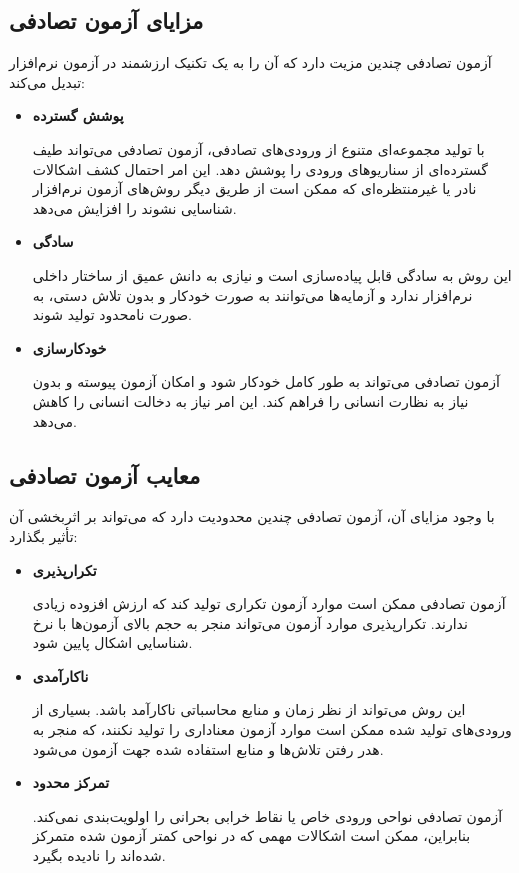 \subsection{مزایای آزمون تصادفی}
آزمون تصادفی چندین مزیت دارد که آن را به یک تکنیک ارزشمند در آزمون نرم‌افزار تبدیل می‌کند:
\begin{itemize}
	\item \textbf{پوشش گسترده}
	
	با تولید مجموعه‌ای متنوع از ورودی‌های تصادفی، آزمون تصادفی می‌تواند طیف گسترده‌ای از سناریوهای ورودی را پوشش دهد. این امر احتمال کشف اشکالات نادر یا غیرمنتظره‌ای که ممکن است از طریق دیگر روش‌های آزمون نرم‌افزار شناسایی نشوند را افزایش می‌دهد.
	\item \textbf{سادگی}
	
	 این روش به سادگی قابل پیاده‌سازی است و نیازی به دانش عمیق از ساختار داخلی نرم‌افزار ندارد و آزمایه‌ها می‌توانند به صورت خودکار و بدون تلاش دستی، به صورت نامحدود تولید شوند.
	\item \textbf{خودکارسازی}
	
	 آزمون تصادفی می‌تواند به طور کامل خودکار شود و امکان آزمون پیوسته و بدون نیاز به نظارت انسانی را فراهم کند. این امر نیاز به دخالت انسانی را کاهش می‌دهد.

\end{itemize}

\subsection{معایب آزمون تصادفی}
با وجود مزایای آن، آزمون تصادفی چندین محدودیت دارد که می‌تواند بر اثربخشی آن تأثیر بگذارد:
\begin{itemize}
	\item \textbf{تکرارپذیری}
	
	آزمون تصادفی ممکن است موارد آزمون تکراری تولید کند که ارزش افزوده زیادی ندارند. تکرارپذیری موارد آزمون می‌تواند منجر به حجم بالای آزمون‌ها با نرخ شناسایی اشکال پایین شود.
	\item \textbf{ناکارآمدی}
	
	 این روش می‌تواند از نظر زمان و منابع محاسباتی ناکارآمد باشد. بسیاری از ورودی‌های تولید شده ممکن است موارد آزمون معناداری را تولید نکنند، که منجر به هدر رفتن تلاش‌ها و منابع استفاده شده جهت آزمون می‌شود.
	\item \textbf{تمرکز محدود}
	
	 آزمون تصادفی نواحی ورودی خاص یا نقاط خرابی بحرانی را اولویت‌بندی نمی‌کند. بنابراین، ممکن است اشکالات مهمی که در نواحی کمتر آزمون شده متمرکز شده‌اند را نادیده بگیرد.
\end{itemize}


